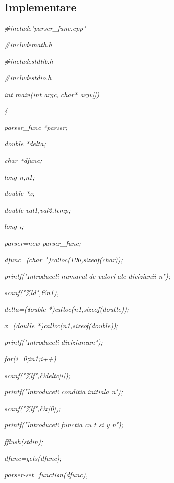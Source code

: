 \documentclass[a4paper,twoside]{book}
\begin{document}
\subsection{Implementare}

\textit{\#include"parser\_func.cpp"}

\textit{\#include\TEXTsymbol{<}math.h\TEXTsymbol{>}}

\textit{\#include\TEXTsymbol{<}stdlib.h\TEXTsymbol{>}}

\textit{\#include\TEXTsymbol{<}stdio.h\TEXTsymbol{>}}

\textit{int main(int argc, char* argv[])}

\textit{\{}

\textit{\qquad parser\_func *parser;}

\textit{\qquad double *delta;}

\textit{\qquad char *dfunc;}

\textit{\qquad long n,n1;}

\textit{\qquad double *x;}

\textit{\qquad double val1,val2,temp;}

\textit{\qquad long i;}

\textit{\qquad parser=new parser\_func;}

\textit{\qquad dfunc=(char *)calloc(100,sizeof(char));}

\textit{\qquad printf("Introduceti numarul de valori ale diviziunii%
\TEXTsymbol{\backslash}n");}

\textit{\qquad scanf("\%ld",\&n1);}

\textit{\qquad delta=(double *)calloc(n1,sizeof(double));}

\textit{\qquad x=(double *)calloc(n1,sizeof(double));}

\textit{\qquad printf("Introduceti diviziunea\TEXTsymbol{\backslash}n");}

\textit{\qquad for(i=0;i\TEXTsymbol{<}n1;i++)}

\textit{\qquad \qquad scanf("\%lf",\&delta[i]);}

\textit{\qquad printf("Introduceti conditia initiala\TEXTsymbol{\backslash}%
n");}

\textit{\qquad scanf("\%lf",\&x[0]);}

\textit{\qquad printf("Introduceti functia cu t si y\TEXTsymbol{\backslash}%
n");}

\textit{\qquad fflush(stdin);}

\textit{\qquad dfunc=gets(dfunc);}

\textit{\qquad parser-\TEXTsymbol{>}set\_function(dfunc);}
\end{document}
